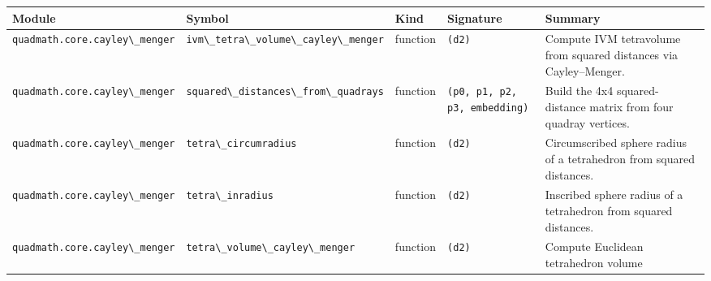 \documentclass[
  10pt,
]{article}
\newcommand{\passthrough}[1]{#1}
\newcounter{none} %
\begin{document}
{\def\LTcaptype{none} %
\begin{longtable}[]{@{}
  >{\raggedright\arraybackslash}p{}
  >{\raggedright\arraybackslash}p{}
  >{\raggedright\arraybackslash}p{}
  >{\raggedright\arraybackslash}p{}
  >{\raggedright\arraybackslash}p{}@{}}
\toprule\noalign{}
\begin{minipage}[b]{\linewidth}\raggedright
Module
\end{minipage} & \begin{minipage}[b]{\linewidth}\raggedright
Symbol
\end{minipage} & \begin{minipage}[b]{\linewidth}\raggedright
Kind
\end{minipage} & \begin{minipage}[b]{\linewidth}\raggedright
Signature
\end{minipage} & \begin{minipage}[b]{\linewidth}\raggedright
Summary
\end{minipage} \\
\midrule\noalign{}
\endhead
\bottomrule\noalign{}
\endlastfoot
\passthrough{\lstinline!quadmath.core.cayley\_menger!} &
\passthrough{\lstinline!ivm\_tetra\_volume\_cayley\_menger!} & function
& \passthrough{\lstinline!(d2)!} & Compute IVM tetravolume from squared
distances via Cayley--Menger. \\
\passthrough{\lstinline!quadmath.core.cayley\_menger!} &
\passthrough{\lstinline!squared\_distances\_from\_quadrays!} & function
& \passthrough{\lstinline!(p0, p1, p2, p3, embedding)!} & Build the 4x4
squared-distance matrix from four quadray vertices. \\
\passthrough{\lstinline!quadmath.core.cayley\_menger!} &
\passthrough{\lstinline!tetra\_circumradius!} & function &
\passthrough{\lstinline!(d2)!} & Circumscribed sphere radius of a
tetrahedron from squared distances. \\
\passthrough{\lstinline!quadmath.core.cayley\_menger!} &
\passthrough{\lstinline!tetra\_inradius!} & function &
\passthrough{\lstinline!(d2)!} & Inscribed sphere radius of a
tetrahedron from squared distances. \\
\passthrough{\lstinline!quadmath.core.cayley\_menger!} &
\passthrough{\lstinline!tetra\_volume\_cayley\_menger!} & function &
\passthrough{\lstinline!(d2)!} & Compute Euclidean tetrahedron volume

\end{longtable}}
\end{document}
